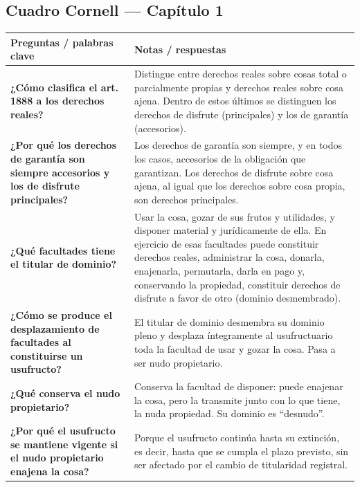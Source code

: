 \documentclass[12pt,oneside]{book}
\begin{document}
\subsection*{Cuadro Cornell --- Capítulo 1}

\begin{longtable}{
    >{\raggedright\arraybackslash}p{}
    >{\raggedright\arraybackslash}p{}
}
\toprule
\textbf{Preguntas / palabras clave} &
\textbf{Notas / respuestas} \\
\midrule
\endhead

\textbf{¿Cómo clasifica el art. 1888 a los derechos reales?} &
Distingue entre derechos reales sobre cosas total o parcialmente propias y derechos reales sobre cosa ajena. Dentro de estos últimos se distinguen los derechos de disfrute (principales) y los de garantía (accesorios). \\

\textbf{¿Por qué los derechos de garantía son siempre accesorios y los de disfrute principales?} &
Los derechos de garantía son siempre, y en todos los casos, accesorios de la obligación que garantizan. Los derechos de disfrute sobre cosa ajena, al igual que los derechos sobre cosa propia, son derechos principales. \\

\textbf{¿Qué facultades tiene el titular de dominio?} &
Usar la cosa, gozar de sus frutos y utilidades, y disponer material y jurídicamente de ella. En ejercicio de esas facultades puede constituir derechos reales, administrar la cosa, donarla, enajenarla, permutarla, darla en pago y, conservando la propiedad, constituir derechos de disfrute a favor de otro (dominio desmembrado). \\

\textbf{¿Cómo se produce el desplazamiento de facultades al constituirse un usufructo?} &
El titular de dominio desmembra su dominio pleno y desplaza íntegramente al usufructuario toda la facultad de usar y gozar la cosa. Pasa a ser nudo propietario. \\

\textbf{¿Qué conserva el nudo propietario?} &
Conserva la facultad de disponer: puede enajenar la cosa, pero la transmite junto con lo que tiene, la nuda propiedad. Su dominio es ``desnudo''. \\

\textbf{¿Por qué el usufructo se mantiene vigente si el nudo propietario enajena la cosa?} &
Porque el usufructo continúa hasta su extinción, es decir, hasta que se cumpla el plazo previsto, sin ser afectado por el cambio de titularidad registral. \\


\end{longtable}
\end{document}
